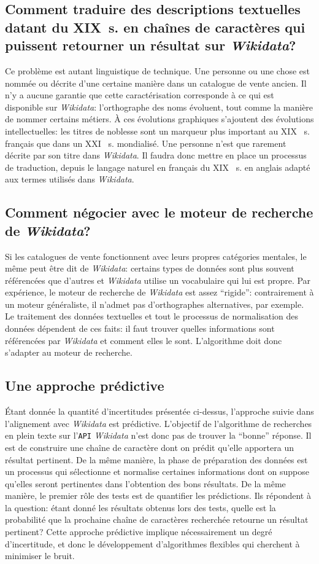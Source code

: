 \documentclass[a4paper, 12pt, twoside]{book}
\newcommand{\scl}[1]{%
	#1%
	\ifthenelse{\equal{#1}{I}}{\up{er}}{\up{ème}}%
	~s.%
}
\newcommand{\api}{\texttt{API}}
\newcommand{\wkd}{\textit{Wikidata}}
\begin{document}
\subsection{Comment traduire des descriptions textuelles datant du XIX~s. en chaînes de caractères qui puissent retourner un résultat sur \wkd{}?} 
Ce problème est autant linguistique de technique. Une personne ou une chose est nommée ou décrite d'une certaine manière dans un catalogue de vente ancien. Il n'y a aucune garantie que cette caractérisation corresponde à ce qui est disponible sur \wkd{}: l'orthographe des noms évoluent, tout comme la manière de nommer certains métiers. À ces évolutions graphiques s'ajoutent des évolutions intellectuelles: les titres de noblesse sont un marqueur plus important au \scl{XIX} français que dans un \scl{XXI} mondialisé. Une personne n'est que rarement décrite par son titre dans \wkd{}. Il faudra donc mettre en place un processus de traduction, depuis le langage naturel en français du \scl{XIX} en anglais adapté aux termes utilisés dans \wkd{}.

\subsection{Comment négocier avec le moteur de recherche de \wkd{}?} 
Si les catalogues de vente fonctionnent avec leurs propres catégories mentales, le même peut être dit de \wkd{}: certains types de données sont plus souvent référencées que d'autres et \wkd{} utilise un vocabulaire qui lui est propre. Par expérience, le moteur de recherche de \wkd{} est assez \enquote{rigide}: contrairement à un moteur généraliste, il n'admet pas d'orthographes alternatives, par exemple. Le traitement des données textuelles et tout le processus de normalisation des données dépendent de ces faits: il faut trouver quelles informations sont référencées par \wkd{} et comment elles le sont. L'algorithme doit donc s'adapter au moteur de recherche. 

\subsection{Une approche prédictive}
Étant donnée la quantité d'incertitudes présentée ci-dessus, l'approche suivie dans l'alignement avec \wkd{} est prédictive. L'objectif de l'algorithme de recherches en plein texte sur l'\api{} \wkd{} n'est donc pas de trouver la \enquote{bonne} réponse. Il est de construire une chaîne de caractère dont on prédit qu'elle apportera un résultat pertinent. De la même manière, la phase de préparation des données est un processus qui sélectionne et normalise certaines informations dont on suppose qu'elles seront pertinentes dans l'obtention des bons résultats. De la même manière, le premier rôle des tests est de quantifier les prédictions. Ils répondent à la question: étant donné les résultats obtenus lors des tests, quelle est la probabilité que la prochaine chaîne de caractères recherchée retourne un résultat pertinent? Cette approche prédictive implique nécessairement un degré d'incertitude, et donc le développement d'algorithmes flexibles qui cherchent à minimiser le bruit.
\end{document}
